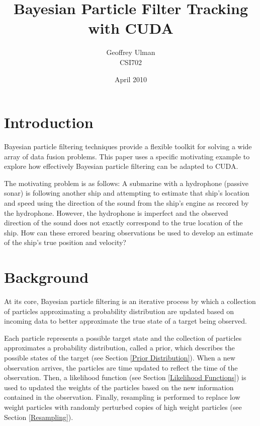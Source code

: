 \documentclass{article}
\begin{document}
\title{Bayesian Particle Filter Tracking with CUDA}
\author{Geoffrey Ulman\\
        CSI702}
\date{April 2010}
\maketitle

\tableofcontents

\section{Introduction}\label{Introduction}
Bayesian particle filtering techniques provide a flexible toolkit for solving a wide array of data fusion problems. This paper uses a specific motivating example to explore how effectively Bayesian particle filtering can be adapted to CUDA.

The motivating problem is as follows: A submarine with a hydrophone (passive sonar) is following another ship and attempting to estimate that ship's location and speed using the direction of the sound from the ship's engine as recored by the hydrophone. However, the hydrophone is imperfect and the observed direction of the sound does not exactly correspond to the true location of the ship. How can these errored bearing observations be used to develop an estimate of the ship's true position and velocity?

\section{Background}\label{Background}
At its core, Bayesian particle filtering is an iterative process by which a collection of particles approximating a probability distribution are updated based on incoming data to better approximate the true state of a target being observed.

Each particle represents a possible target state and the collection of particles approximates a probability distribution, called a prior, which describes the possible states of the target (see Section \ref{Prior Distribution}). When a new observation arrives, the particles are time updated to reflect the time of the observation. Then, a likelihood function (see Section \ref{Likelihood Functions}) is used to updated the weights of the particles based on the new information contained in the observation. Finally, resampling is performed to replace low weight particles with randomly perturbed copies of high weight particles (see Section \ref{Resampling}).
\end{document}
